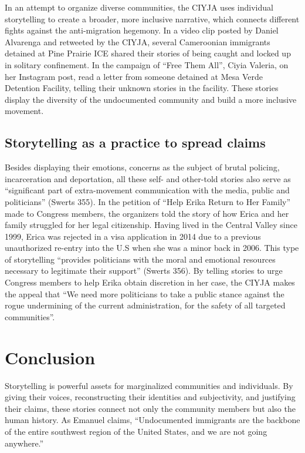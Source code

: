 \documentclass[12pt]{article}
\begin{document}
\begin{flushleft}
In an attempt to organize diverse communities, the CIYJA uses individual storytelling to create a broader, more inclusive narrative, which connects different fights against the anti-migration hegemony.
In a video clip posted by Daniel Alvarenga and retweeted by the CIYJA, several Cameroonian immigrants detained at Pine Prairie ICE shared their stories of being caught and locked up in solitary confinement.
In the campaign of ``Free Them All'', Ciyia Valeria, on her Instagram post, read a letter from someone detained at Mesa Verde Detention Facility, telling their unknown stories in the facility.
These stories display the diversity of the undocumented community and build a more inclusive movement.

\subsection*{Storytelling as a practice to spread claims}

Besides displaying their emotions, concerns as the subject of brutal policing, incarceration and deportation, all these self- and other-told stories also serve as ``significant part of extra-movement communication with the media, public and politicians'' (Swerts 355). %
In the petition of ``Help Erika Return to Her Family'' made to Congress members, the organizers told the story of how Erica and her family struggled for her legal citizenship. %
Having lived in the Central Valley since 1999, Erica was rejected in a visa application in 2014 due to a previous unauthorized re-entry into the U.S when she was a minor back in 2006.
This type of storytelling ``provides politicians with the moral and emotional resources necessary to legitimate their support'' (Swerts 356).
By telling stories to urge Congress members to help Erika obtain discretion in her case, the CIYJA makes the appeal that ``We need more politicians to take a public stance against the rogue undermining of the current administration, for the safety of all targeted communities''. %

\section{Conclusion}

Storytelling is powerful assets for marginalized communities and individuals.
By giving their voices, reconstructing their identities and subjectivity, and justifying their claims, these stories connect not only the community members but also the human history.
As Emanuel claims, ``Undocumented immigrants are the backbone of the entire southwest region of the United States, and we are not going anywhere.'' %


\end{flushleft}
\end{document}
